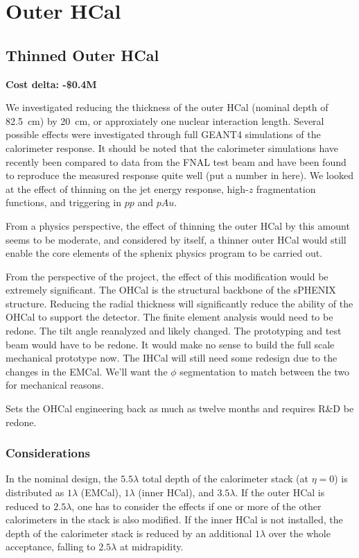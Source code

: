\section{Outer HCal}
\subsection{Thinned Outer HCal}
\label{ohcal_thin}

\textbf{Cost delta: -\$0.4M}

We investigated reducing the thickness of the outer HCal (nominal
depth of 82.5~cm) by 20~cm, or approxiately one nuclear interaction
length.  Several possible effects were investigated through full
\textsc{GEANT4} simulations of the calorimeter response.  It should be
noted that the calorimeter simulations have recently been compared to
data from the FNAL test beam and have been found to reproduce the
measured response quite well (put a number in here).  We looked at the
effect of thinning on the jet energy response, high-$z$ fragmentation
functions, and triggering in $pp$ and $pAu$.

From a physics perspective, the effect of thinning the outer HCal by
this amount seems to be moderate, and considered by itself, a thinner
outer HCal would still enable the core elements of the sphenix physics
program to be carried out.

From the perspective of the project, the effect of this modification
would be extremely significant.  The OHCal is the structural backbone
of the sPHENIX structure.  Reducing the radial thickness will
significantly reduce the ability of the OHCal to support the detector.
The finite element analysis would need to be redone. The tilt angle
reanalyzed and likely changed. The prototyping and test beam would
have to be redone.  It would make no sense to build the full scale
mechanical prototype now.  The IHCal will still need some redesign due
to the changes in the EMCal. We’ll want the $\phi$ segmentation to
match between the two for mechanical reasons.

Sets the OHCal engineering back as much as twelve months and requires
R\&D be redone.

\subsubsection*{Considerations}

In the nominal design, the $5.5 \lambda$ total depth of the
calorimeter stack (at $\eta = 0$) is distributed as $1 \lambda$
(EMCal), $1 \lambda$ (inner HCal), and $3.5 \lambda$.  If the outer
HCal is reduced to $2.5 \lambda$, one has to consider the effects if
one or more of the other calorimeters in the stack is also modified.
If the inner HCal is not installed, the depth of the calorimeter stack
is reduced by an additional $1 \lambda$ over the whole acceptance,
falling to $2.5 \lambda$ at midrapidity.

